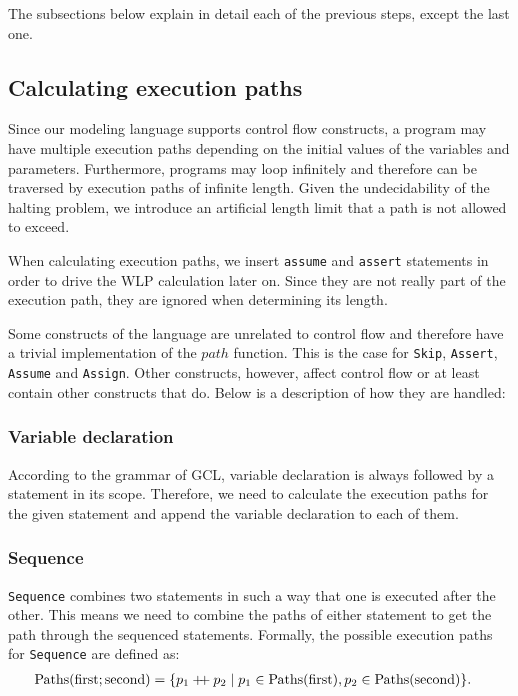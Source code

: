 \documentclass[a4paper]{article}
\newcommand\mdoubleplus{\ensuremath{\mathbin{+\mkern-5mu+}}}
\begin{document}
The subsections below explain in detail each of the previous steps, except the last
one.

\subsection{Calculating execution paths}

Since our modeling language supports control flow constructs, a program may have
multiple execution paths depending on the initial values of the variables and
parameters. Furthermore, programs may loop infinitely and therefore can be traversed
by execution paths of infinite length. Given the undecidability of the halting
problem, we introduce an artificial length limit that a path is not allowed to exceed.

When calculating execution paths, we insert \texttt{assume} and \texttt{assert}
statements in order to drive the WLP calculation later on. Since they are not
really part of the execution path, they are ignored when determining its length.

Some constructs of the language are unrelated to control flow and therefore have
a trivial implementation of the $path$ function. This is the case for
\texttt{Skip}, \texttt{Assert}, \texttt{Assume} and \texttt{Assign}. Other
constructs, however, affect control flow or at least contain other constructs
that do. Below is a description of how they are handled:

\subsubsection*{Variable declaration}

According to the grammar of GCL, variable declaration is always followed by a
statement in its scope. Therefore, we need to calculate the execution paths for
the given statement and append the variable declaration to each of them.

\subsubsection*{Sequence}

\texttt{Sequence} combines two statements in such a way that one is executed
after the other. This means we need to combine the paths of either statement
to get the path through the sequenced statements. Formally, the possible
execution paths for \texttt{Sequence} are defined as:
\begin{align*}
	\text{Paths}(\text{first} ; \text{second}) &= \{ p_1 \mdoubleplus p_2 \mid p_1 \in \text{Paths}(\text{first}), p_2 \in \text{Paths}(\text{second})\}.
\end{align*}
\end{document}
